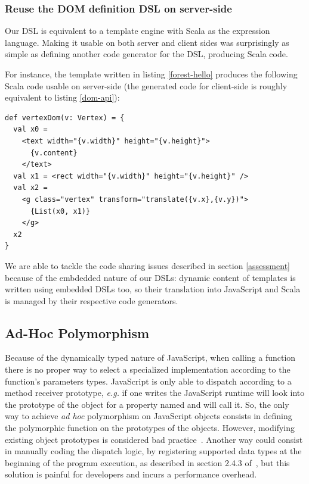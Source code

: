 \documentclass[preprint]{sigplanconf}
\newcommand{\eg}{\emph{e.g.}}
\begin{document}
\subsubsection{Reuse the DOM definition DSL on server-side}

Our DSL is equivalent to a template engine with Scala as the expression language. Making it usable on both server and
client sides was surprisingly as simple as defining another code generator for the DSL, producing Scala code.

For instance, the template written in listing \ref{forest-hello} produces the following Scala code usable on
server-side (the generated code for client-side is roughly equivalent to listing \ref{dom-api}):

\begin{lstlisting}
def vertexDom(v: Vertex) = {
  val x0 =
    <text width="{v.width}" height="{v.height}">
      {v.content}
    </text>
  val x1 = <rect width="{v.width}" height="{v.height}" />
  val x2 =
    <g class="vertex" transform="translate({v.x},{v.y})">
      {List(x0, x1)}
    </g>
  x2
}
\end{lstlisting}

We are able to tackle the code sharing issues described in section \ref{assessment} because of the embdedded nature
of our DSLs: dynamic content of templates is written using embedded DSLs too, so their translation into JavaScript
and Scala is managed by their respective code generators.

\subsection{Ad-Hoc Polymorphism}

Because of the dynamically typed nature of JavaScript, when calling a function there is no proper way to select a
specialized implementation according to the function’s parameters types. JavaScript is only able to dispatch
according to a method receiver prototype, \eg{} if one writes  the JavaScript runtime will look into
the prototype of the  object for a property named  and will call it. So, the only way to achieve
\emph{ad hoc} polymorphism on JavaScript objects consists in defining the polymorphic function on the prototypes of
the objects. However, modifying existing object prototypes is considered bad
practice~\cite{Zakas12_MaintainableJs}. Another way could consist in manually coding the dispatch logic, by
registering supported data types at the beginning of the program execution, as described in section 2.4.3
of~\cite{Abelson83_SICP}, but this solution is painful for developers and incurs a performance overhead.
\end{document}
